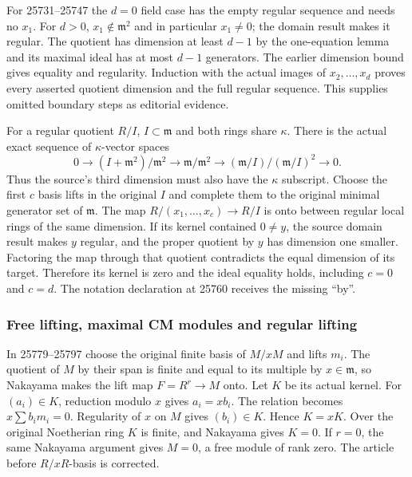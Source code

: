 For 25731--25747 the \(d=0\) field case has the empty regular sequence and needs no \(x_1\). For \(d>0\), \(x_1\notin\mathfrak m^2\) and in particular \(x_1\ne0\); the domain result makes it regular. The quotient has dimension at least \(d-1\) by the one-equation lemma and its maximal ideal has at most \(d-1\) generators. The earlier dimension bound gives equality and regularity. Induction with the actual images of \(x_2,\ldots,x_d\) proves every asserted quotient dimension and the full regular sequence. This supplies omitted boundary steps as editorial evidence.

For a regular quotient \(R/I\), \(I\subset\mathfrak m\) and both rings share \(\kappa\). There is the actual exact sequence of \(\kappa\)-vector spaces \[
 0\longrightarrow (I+\mathfrak m^2)/\mathfrak m^2
 \longrightarrow \mathfrak m/\mathfrak m^2
 \longrightarrow (\mathfrak m/I)/(\mathfrak m/I)^2\longrightarrow0 .
\] Thus the source's third dimension must also have the \(\kappa\) subscript. Choose the first \(c\) basis lifts in the original \(I\) and complete them to the original minimal generator set of \(\mathfrak m\). The map \(R/(x_1,\ldots,x_c)\to R/I\) is onto between regular local rings of the same dimension. If its kernel contained \(0\ne y\), the source domain result makes \(y\) regular, and the proper quotient by \(y\) has dimension one smaller. Factoring the map through that quotient contradicts the equal dimension of its target. Therefore its kernel is zero and the ideal equality holds, including \(c=0\) and \(c=d\). The notation declaration at 25760 receives the missing ``by''.

\subsubsection{Free lifting, maximal CM modules and regular lifting}\label{algebra-proof-020-free-lifting-maximal-cm-modules-and-regular-lifting}

In 25779--25797 choose the original finite basis of \(M/xM\) and lifts \(m_i\). The quotient of \(M\) by their span is finite and equal to its multiple by \(x\in\mathfrak m\), so Nakayama makes the lift map \(F=R^r\to M\) onto. Let \(K\) be its actual kernel. For \((a_i)\in K\), reduction modulo \(x\) gives \(a_i=xb_i\). The relation becomes \(x\sum b_im_i=0\). Regularity of \(x\) on \(M\) gives \((b_i)\in K\). Hence \(K=xK\). Over the original Noetherian ring \(K\) is finite, and Nakayama gives \(K=0\). If \(r=0\), the same Nakayama argument gives \(M=0\), a free module of rank zero. The article before \(R/xR\)-basis is corrected.

